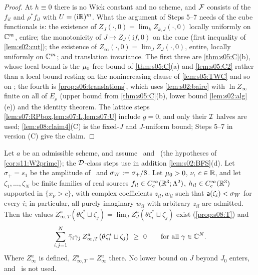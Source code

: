 \begin{proof}
At $h\equiv0$ there is no Wick constant and no scheme, and $\mathcal F$ consists of the $f_{il}$ and $\rho^*f_{il}$ with $U=(\mathrm i\mathbb R)^{m}$. What the argument of Steps 5--7 needs of the cube functionals is: the existence of $Z_J(\cdot,0)=\lim_kZ_{k,J}(\cdot,0)$ locally uniformly on $\mathbb C^m$, entire; the monotonicity of $J\mapsto Z_J(\mathrm if,0)$ on the cone (first inequality of \cref{lem:s02:cut}); the existence of $Z_\infty(\cdot,0)=\lim_JZ_J(\cdot,0)$, entire, locally uniformly on $\mathbb C^m$; and translation invariance. The first three are \cref{thm:s05:C}(b), whose local bound is the $\mu_0$-free bound of \cref{thm:s05:C}(a) and \cref{lem:s05:C2} rather than a local bound resting on the nonincreasing clause of \cref{lem:s05:TWC} and so on \cite[Thm.~6.2(3),(4)]{BFS1}; the fourth is \cref{prop:s06:translations}, which uses \cref{lem:s02:baire} with $\ln Z_\infty$ finite on all of $E_\rho$ (upper bound from \cref{thm:s05:C}(b), lower bound \cref{lem:s02:alg}(e)) and the identity theorem. The lattice steps \cref{lem:s07:RPbox,lem:s07:L,lem:s07:U} include $g=0$, and only their $\mathcal I$ halves are used; \cref{lem:s08:claim4}(C) is the fixed-$J$ and $J$-uniform bound; Steps 5--7 in version (C) give the claim.
\end{proof}

\begin{theorem}\label{thm:s08:OS2WT}
Let $a$ be an admissible scheme, and assume \Itwo\ and \Ithree\ (the hypotheses of \cref{cor:s11:W2prime}); the $\mathcal D$-class steps use in addition \cref{lem:s02:BFS}(d). Let $\sigma_+=s_1$ be the amplitude of \Itwo\ and $\sigma_W:=\sigma_+/8$. Let $\mu_0>0$, $\nu$, $c\in\mathbb R$, and let $\zeta_1,\dots,\zeta_N$ be finite families of real sources $f_{il}\in C^\infty_c(\mathbb R^3;\Lambda^2)$, $h_{il}\in C^\infty_c(\mathbb R^3)$ supported in $\{x_\nu>c\}$, with complex coefficients $z_{il},w_{il}$ such that $\mathsf a(\zeta_i)<\sigma_W$ for every $i$; in particular, all purely imaginary $w_{il}$ with arbitrary $z_{il}$ are admitted. Then the values $Z^a_{\infty,T}(\theta\zeta_i^*\sqcup\zeta_j)=\lim_JZ^a_J(\theta\zeta_i^*\sqcup\zeta_j)$ exist (\cref{prop:s08:T}) and
\[
\sum_{i,j=1}^N\bar\gamma_i\gamma_j\,Z^a_{\infty,T}\big(\theta\zeta_i^*\sqcup\zeta_j\big)\ \ge\ 0\qquad\text{for all }\gamma\in\C^N .
\]
Where $Z^a_\infty$ is defined, $Z^a_{\infty,T}=Z^a_\infty$ there. No lower bound on $J$ beyond $J_0$ enters, and \Wtwo\ is not used.
\end{theorem}

